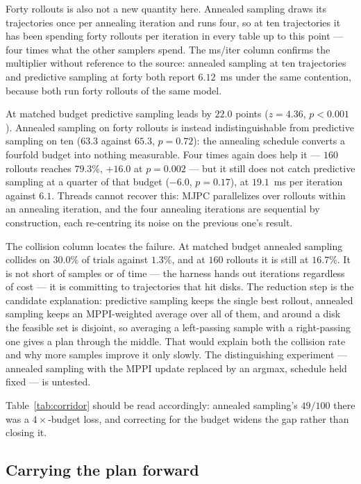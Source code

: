\documentclass[conference]{IEEEtran}
\begin{document}
Forty rollouts is also not a new quantity here. Annealed sampling draws its
trajectories once per annealing iteration and runs four, so at ten trajectories
it has been spending forty rollouts per iteration in every table up to this
point --- four times what the other samplers spend. The ms/iter column confirms
the multiplier without reference to the source: annealed sampling at ten
trajectories and predictive sampling at forty both report $6.12$~ms under the
same contention, because both run forty rollouts of the same model.

At matched budget predictive sampling leads by $22.0$ points ($z = 4.36$,
$p < 0.001$). Annealed sampling on forty rollouts is instead indistinguishable
from predictive sampling on ten ($63.3$ against $65.3$, $p = 0.72$): the
annealing schedule converts a fourfold budget into nothing measurable. Four
times again does help it --- $160$ rollouts reaches $79.3\%$, $+16.0$ at
$p = 0.002$ --- but it still does not catch predictive sampling at a quarter of
that budget ($-6.0$, $p = 0.17$), at $19.1$~ms per iteration against $6.1$.
Threads cannot recover this: MJPC parallelizes over rollouts within an annealing
iteration, and the four annealing iterations are sequential by construction,
each re-centring its noise on the previous one's result.

The collision column locates the failure. At matched budget annealed sampling
collides on $30.0\%$ of trials against $1.3\%$, and at $160$ rollouts it is
still at $16.7\%$. It is not short of samples or of time --- the harness hands
out iterations regardless of cost --- it is committing to trajectories that hit
disks. The reduction step is the candidate explanation: predictive sampling
keeps the single best rollout, annealed sampling keeps an MPPI-weighted average
over all of them, and around a disk the feasible set is disjoint, so averaging a
left-passing sample with a right-passing one gives a plan through the middle.
That would explain both the collision rate and why more samples improve it only
slowly. The distinguishing experiment --- annealed sampling with the MPPI update
replaced by an argmax, schedule held fixed --- is untested.

Table~\ref{tab:corridor} should be read accordingly: annealed sampling's
$49/100$ there was a $4\times$-budget loss, and correcting for the budget widens
the gap rather than closing it.

\subsection{Carrying the plan forward}
\label{sec:sliding}
\end{document}
